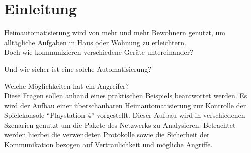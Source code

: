 \newpage
\section{Einleitung}\label{sec:einleitung}
Heimautomatisierung wird von mehr und mehr Bewohnern genutzt,
um alltägliche Aufgaben in Haus oder Wohnung zu erleichtern.\\

Doch wie kommunizieren verschiedene Geräte untereinander?

Und wie sicher ist eine solche Automatisierung?

Welche Möglichkeiten hat ein Angreifer?\\

Diese Fragen sollen anhand eines praktischen Beispiels beantwortet werden.
Es wird der Aufbau einer überschaubaren Heimautomatisierung zur Kontrolle der Spielekonsole \enquote{Playstation 4} vorgestellt.
Dieser Aufbau wird in verschiedenen Szenarien genutzt um die Pakete des Netzwerks zu Analysieren.
Betrachtet werden hierbei die verwendeten Protokolle sowie die Sicherheit der Kommunikation bezogen auf Vertraulichkeit und mögliche Angriffe.
